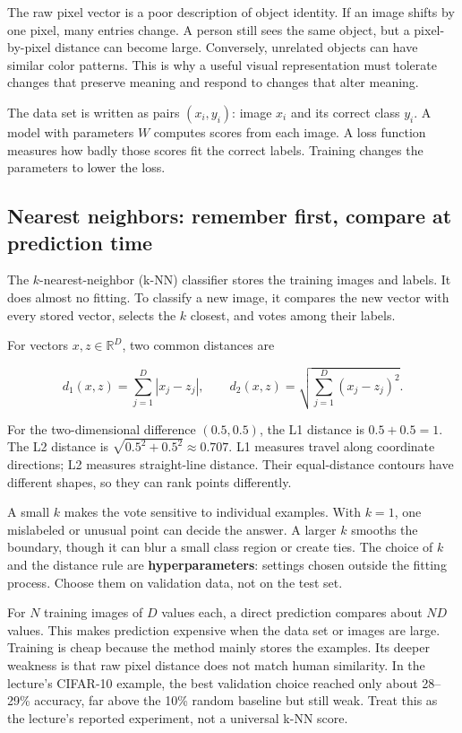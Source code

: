 The raw pixel vector is a poor description of object identity. If an image shifts by one pixel, many entries change. A person still sees the same object, but a pixel-by-pixel distance can become large. Conversely, unrelated objects can have similar color patterns. This is why a useful visual representation must tolerate changes that preserve meaning and respond to changes that alter meaning.

The data set is written as pairs \((x_i,y_i)\): image \(x_i\) and its correct class \(y_i\). A model with parameters \(W\) computes scores from each image. A loss function measures how badly those scores fit the correct labels. Training changes the parameters to lower the loss.

\subsection{Nearest neighbors: remember first, compare at prediction time}\label{04-visual-computing-ii-ch031-nearest-neighbors-remember-first-compare-at-prediction-time}

The \(k\)-nearest-neighbor (k-NN) classifier stores the training images and labels. It does almost no fitting. To classify a new image, it compares the new vector with every stored vector, selects the \(k\) closest, and votes among their labels.

For vectors \(x,z\in\mathbb{R}^D\), two common distances are

\[d_1(x,z)=\sum_{j=1}^{D}|x_j-z_j|, \qquad d_2(x,z)=\sqrt{\sum_{j=1}^{D}(x_j-z_j)^2}.\]

For the two-dimensional difference \((0.5,0.5)\), the L1 distance is \(0.5+0.5=1\). The L2 distance is \(\sqrt{0.5^2+0.5^2}\approx0.707\). L1 measures travel along coordinate directions; L2 measures straight-line distance. Their equal-distance contours have different shapes, so they can rank points differently.

A small \(k\) makes the vote sensitive to individual examples. With \(k=1\), one mislabeled or unusual point can decide the answer. A larger \(k\) smooths the boundary, though it can blur a small class region or create ties. The choice of \(k\) and the distance rule are \textbf{hyperparameters}: settings chosen outside the fitting process. Choose them on validation data, not on the test set.

For \(N\) training images of \(D\) values each, a direct prediction compares about \(ND\) values. This makes prediction expensive when the data set or images are large. Training is cheap because the method mainly stores the examples. Its deeper weakness is that raw pixel distance does not match human similarity. In the lecture's CIFAR-10 example, the best validation choice reached only about 28--29\% accuracy, far above the 10\% random baseline but still weak. Treat this as the lecture's reported experiment, not a universal k-NN score.


